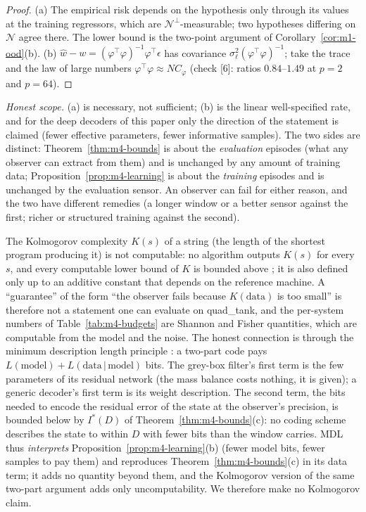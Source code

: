 \begin{proof}
(a) The empirical risk depends on the hypothesis only through its values at the training regressors, which are
$\mathcal N^\perp$-measurable; two hypotheses differing on $\mathcal N$ agree there. The lower bound is the
two-point argument of Corollary~\ref{cor:m1-ood}(b). (b) $\hat w-w=(\varphi^\top\varphi)^{-1}\varphi^\top\epsilon$
has covariance $\sigma_\ell^2(\varphi^\top\varphi)^{-1}$; take the trace and the law of large numbers
$\varphi^\top\varphi\approx NC_\varphi$ (check [6]: ratios $0.84$--$1.49$ at $p=2$ and $p=64$).
\end{proof}
\noindent\emph{Honest scope.} (a) is necessary, not sufficient; (b) is the linear well-specified rate, and for the
deep decoders of this paper only the direction of the statement is claimed (fewer effective parameters, fewer
informative samples). The two sides are distinct: Theorem~\ref{thm:m4-bounds} is about the \emph{evaluation}
episodes (what any observer can extract from them) and is unchanged by any amount of training data;
Proposition~\ref{prop:m4-learning} is about the \emph{training} episodes and is unchanged by the evaluation
sensor. An observer can fail for either reason, and the two have different remedies (a longer window or a better
sensor against the first; richer or structured training against the second).

\begin{remark}\label{rem:m4-kolmogorov}
The Kolmogorov complexity $K(s)$ of a string (the length of the shortest program producing it) is not computable:
no algorithm outputs $K(s)$ for every $s$, and every computable lower bound of $K$ is bounded above
\citep[Thm.~2.3.2 and its corollaries]{li2008kolmogorov}; it is also defined only up to an additive constant that
depends on the reference machine. A ``guarantee'' of the form ``the observer fails because $K(\text{data})$ is too
small'' is therefore not a statement one can evaluate on quad\_tank, and the per-system numbers of
Table~\ref{tab:m4-budgets} are Shannon and Fisher quantities, which are computable from the model and the noise.
The honest connection is through the minimum description length principle \citep{rissanen1978modeling,grunwald2007mdl}:
a two-part code pays $L(\text{model})+L(\text{data}\,|\,\text{model})$ bits. The grey-box filter's first term is the
few parameters of its residual network (the mass balance costs nothing, it is given); a generic decoder's first
term is its weight description. The second term, the bits needed to encode the residual error of the state at the
observer's precision, is bounded below by $I^*(D)$ of Theorem~\ref{thm:m4-bounds}(c): no coding scheme describes
the state to within $D$ with fewer bits than the window carries. MDL thus \emph{interprets}
Proposition~\ref{prop:m4-learning}(b) (fewer model bits, fewer samples to pay them) and reproduces
Theorem~\ref{thm:m4-bounds}(c) in its data term; it adds no quantity beyond them, and the Kolmogorov version of
the same two-part argument \citep[Ch.~5]{li2008kolmogorov} adds only uncomputability. We therefore make no
Kolmogorov claim.
\end{remark}

